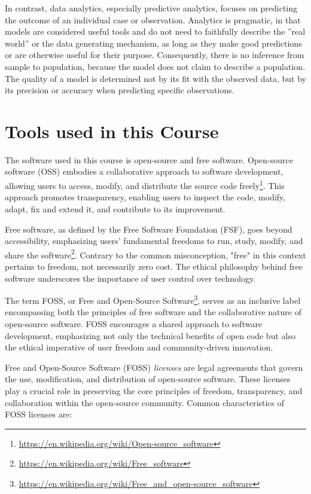 In contrast, data analytics, especially predictive analytics, focuses on predicting the outcome of an individual case or observation. Analytics is pragmatic, in that models are considered useful tools and do not need to faithfully describe the ''real world'' or the data generating mechanism, as long as they make good predictions or are otherwise useful for their purpose. Consequently, there is no inference from sample to population, because the model does not claim to describe a population. The quality of a model is determined not by its fit with the observed data, but by its precision or accuracy when predicting specific observations. 

\section{Tools used in this Course}

The software used in this course is open-source and free software. Open-source software (OSS) embodies a collaborative approach to software development, allowing users to access, modify, and distribute the source code freely\footnote{\url{https://en.wikipedia.org/wiki/Open-source_software}}. This approach promotes transparency, enabling users to inspect the code, modify, adapt, fix and extend it, and contribute to its improvement. 

Free software, as defined by the Free Software Foundation (FSF), goes beyond accessibility, emphasizing users' fundamental freedoms to run, study, modify, and share the software\footnote{\url{https://en.wikipedia.org/wiki/Free_software}}. Contrary to the common misconception, "free" in this context pertains to freedom, not necessarily zero cost. The ethical philosophy behind free software underscores the importance of user control over technology. 

The term FOSS, or Free and Open-Source Software\footnote{\url{https://en.wikipedia.org/wiki/Free_and_open-source_software}}, serves as an inclusive label encompassing both the principles of free software and the collaborative nature of open-source software. FOSS encourages a shared approach to software development, emphasizing not only the technical benefits of open code but also the ethical imperative of user freedom and community-driven innovation.

Free and Open-Source Software (FOSS) \emph{licenses} are legal agreements that govern the use, modification, and distribution of open-source software. These licenses play a crucial role in preserving the core principles of freedom, transparency, and collaboration within the open-source community. Common characteristics of FOSS licenses are:

